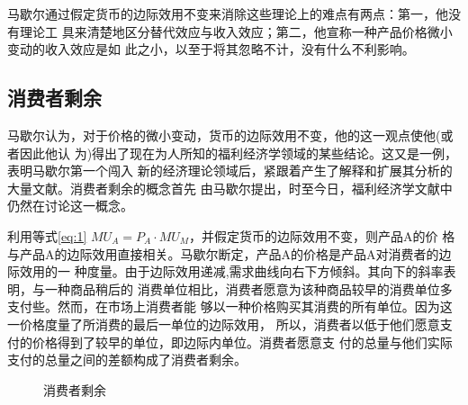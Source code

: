马歇尔通过假定货币的边际效用不变来消除这些理论上的难点有两点：第一，他没有理论工
具来清楚地区分替代效应与收入效应；第二，他宣称一种产品价格微小变动的收入效应是如
此之小，以至于将其忽略不计，没有什么不利影响。

\subsection{消费者剩余}

马歇尔认为，对于价格的微小变动，货币的边际效用不变，他的这一观点使他(或者因此他认
为)得出了现在为人所知的福利经济学领域的某些结论。这又是一例，表明马歇尔第一个闯入
新的经济理论领域后，紧跟着产生了解释和扩展其分析的大量文献。消费者剩余的概念首先
由马歇尔提出，时至今日，福利经济学文献中仍然在讨论这一概念。

利用等式\cref{eq:1} $MU_A=P_A \cdot MU_M$，并假定货币的边际效用不变，则产品A的价
格与产品A的边际效用直接相关。马歇尔断定，产品A的价格是产品A对消费者的边际效用的一
种度量。由于边际效用递减,需求曲线向右下方倾斜。其向下的斜率表明，与一种商品稍后的
消费单位相比，消费者愿意为该种商品较早的消费单位多支付些。然而，在市场上消费者能
够以一种价格购买其消费的所有单位。因为这一价格度量了所消费的最后一单位的边际效用，
所以，消费者以低于他们愿意支付的价格得到了较早的单位，即边际内单位。消费者愿意支
付的总量与他们实际支付的总量之间的差额构成了消费者剩余。
\begin{figure}[ht]
  \centering
  \caption{\label{fig:conssurplus}消费者剩余}
\end{figure}

